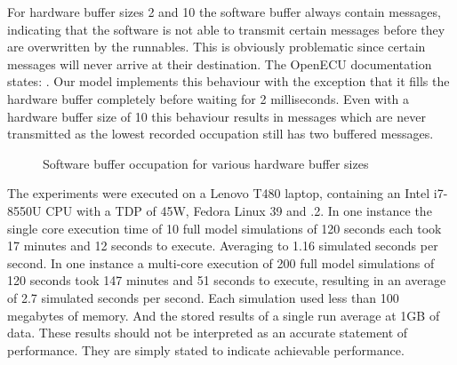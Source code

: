 For hardware buffer sizes 2 and 10 the software buffer always contain messages, indicating that the software is not able to transmit certain messages before they are overwritten by the runnables. This is obviously problematic since certain messages will never arrive at their destination. The OpenECU documentation states: . Our model implements this behaviour with the exception that it fills the hardware buffer completely before waiting for 2 milliseconds. Even with a hardware buffer size of 10 this behaviour results in messages which are never transmitted as the lowest recorded occupation still has two buffered messages. 
\begin{figure}[htb]
    \centering
    
    \caption{Software buffer occupation for various hardware buffer sizes}
    \label{fig:buffer_size}
\end{figure}

The experiments were executed on a Lenovo T480 laptop, containing an Intel i7-8550U CPU with a TDP of 45W, Fedora Linux 39 and .2. In one instance the single core execution time of 10 full model simulations of 120 seconds each took 17 minutes and 12 seconds to execute. Averaging to 1.16 simulated seconds per second. In one instance a multi-core execution of 200 full model simulations of 120 seconds took 147 minutes and 51 seconds to execute, resulting in an average of 2.7 simulated seconds per second. Each simulation used less than 100 megabytes of memory. And the stored results of a single run average at 1GB of data. These results should not be interpreted as an accurate statement of performance. They are simply stated to indicate achievable performance.